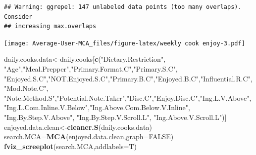 \documentclass[
]{article}
\newenvironment{Shaded}{\begin{snugshade}}{\end{snugshade}}
\newcommand{\DataTypeTok}[1]{\textcolor[rgb]{0.13,0.29,0.53}{#1}}
\newcommand{\KeywordTok}[1]{\textcolor[rgb]{0.13,0.29,0.53}{\textbf{#1}}}
\newcommand{\NormalTok}[1]{#1}
\newcommand{\OtherTok}[1]{\textcolor[rgb]{0.56,0.35,0.01}{#1}}
\newcommand{\StringTok}[1]{\textcolor[rgb]{0.31,0.60,0.02}{#1}}
\begin{document}
\begin{Shaded}
\end{Shaded}

\begin{verbatim}
## Warning: ggrepel: 147 unlabeled data points (too many overlaps). Consider
## increasing max.overlaps
\end{verbatim}

\texttt{[image: Average-User-MCA\_files/figure-latex/weekly cook enjoy-3.pdf]}

\begin{Shaded}
\begin{Highlighting}[]
\NormalTok{daily.cooks.data<-daily.cooks[}\KeywordTok{c}\NormalTok{(}\StringTok{"Dietary.Restriction"}\NormalTok{, }\StringTok{"Age"}\NormalTok{,}\StringTok{"Meal.Prepper"}\NormalTok{,}\StringTok{"Primary.Format.C"}\NormalTok{,}\StringTok{"Primary.S.C"}\NormalTok{,}
            \StringTok{"Enjoyed.S.C"}\NormalTok{,}\StringTok{"NOT.Enjoyed.S.C"}\NormalTok{,}\StringTok{"Primary.B.C"}\NormalTok{,}\StringTok{"Enjoyed.B.C"}\NormalTok{,}\StringTok{"Influential.R.C"}\NormalTok{, }
            \StringTok{"Mod.Note.C"}\NormalTok{, }
            \StringTok{"Note.Method.S"}\NormalTok{,}\StringTok{"Potential.Note.Taker"}\NormalTok{,}\StringTok{"Disc.C"}\NormalTok{,}\StringTok{"Enjoy.Disc.C"}\NormalTok{,}\StringTok{"Ing.L.V.Above"}\NormalTok{,}
            \StringTok{"Ing.L.Com.Inline.V.Below"}\NormalTok{,}\StringTok{"Ing.Above.Com.Below.V.Inline"}\NormalTok{,  }\StringTok{"Ing.By.Step.V.Above"}\NormalTok{,  }\StringTok{"Ing.By.Step.V.Scroll.L"}\NormalTok{,}
            \StringTok{"Ing.Above.V.Scroll.L"}\NormalTok{)]}
\NormalTok{enjoyed.data.clean<-}\KeywordTok{cleaner.S}\NormalTok{(daily.cooks.data)}
\NormalTok{search.MCA=}\KeywordTok{MCA}\NormalTok{(enjoyed.data.clean,}\DataTypeTok{graph=}\OtherTok{FALSE}\NormalTok{)}
\KeywordTok{fviz_screeplot}\NormalTok{(search.MCA,}\DataTypeTok{addlabels=}\NormalTok{T)}
\end{Highlighting}
\end{Shaded}
\end{document}
